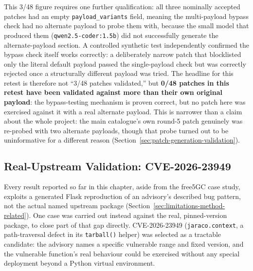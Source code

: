 \documentclass[12pt,a4paper]{report}
\begin{document}
This 3/48 figure requires one further qualification: all three nominally accepted patches had an empty \texttt{payload\_variants} field, meaning the multi-payload bypass check had no alternate payload to probe them with, because the small model that produced them (\texttt{qwen2.5-coder:1.5b}) did not successfully generate the alternate-payload section. A controlled synthetic test independently confirmed the bypass check itself works correctly: a deliberately narrow patch that blocklisted only the literal default payload passed the single-payload check but was correctly rejected once a structurally different payload was tried. The headline for this retest is therefore not ``3/48 patches validated,'' but \textbf{0/48 patches in this retest have been validated against more than their own original payload}: the bypass-testing mechanism is proven correct, but no patch here was exercised against it with a real alternate payload. This is narrower than a claim about the whole project: the main catalogue's own round-5 patch genuinely was re-probed with two alternate payloads, though that probe turned out to be uninformative for a different reason (Section~\ref{sec:patch-generation-validation}).

\subsection{Real-Upstream Validation: CVE-2026-23949}
\label{sec:real-upstream-validation}

Every result reported so far in this chapter, aside from the free5GC case study, exploits a generated Flask reproduction of an advisory's described bug pattern, not the actual named upstream package (Section~\ref{sec:limitations-method-related}). One case was carried out instead against the real, pinned-version package, to close part of that gap directly. CVE-2026-23949 (\texttt{jaraco.context}, a path-traversal defect in its \texttt{tarball()} helper) was selected as a tractable candidate: the advisory names a specific vulnerable range and fixed version, and the vulnerable function's real behaviour could be exercised without any special deployment beyond a Python virtual environment.
\end{document}
